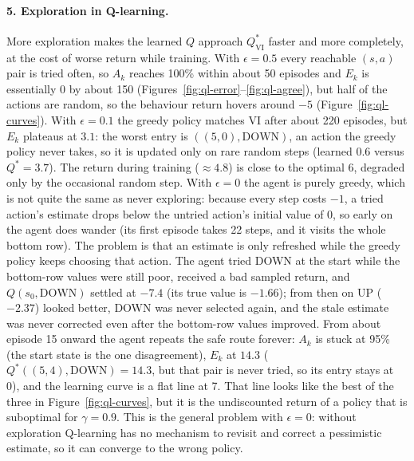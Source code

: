 \documentclass[11pt,letterpaper]{article}
\newcommand{\QVI}{Q^*_{\mathrm{VI}}}
\begin{document}
\paragraph{5. Exploration in Q-learning.}
More exploration makes the learned $Q$ approach $\QVI$ faster and more
completely, at the cost of worse return while training. With
$\epsilon = 0.5$ every reachable $(s,a)$ pair is tried often, so $A_k$
reaches 100\% within about 50 episodes and $E_k$ is essentially 0 by about
150 (Figures~\ref{fig:ql-error}--\ref{fig:ql-agree}), but half of the
actions are random, so the behaviour return hovers around $-5$
(Figure~\ref{fig:ql-curves}). With $\epsilon = 0.1$ the greedy policy
matches VI after about 220 episodes, but $E_k$ plateaus at $3.1$: the
worst entry is $((5,0),\text{DOWN})$, an action the greedy policy never
takes, so it is updated only on rare random steps (learned $0.6$ versus
$Q^* = 3.7$). The return during training ($\approx 4.8$) is close to the
optimal 6, degraded only by the occasional random step. With
$\epsilon = 0$ the agent is purely greedy, which is not quite the same as
never exploring: because every step costs $-1$, a tried action's estimate
drops below the untried action's initial value of 0, so early on the agent
does wander (its first episode takes 22 steps, and it visits the whole
bottom row). The problem is that an estimate is only refreshed while the
greedy policy keeps choosing that action. The agent tried DOWN at the
start while the bottom-row values were still poor, received a bad sampled
return, and $Q(s_0,\text{DOWN})$ settled at $-7.4$ (its true value is
$-1.66$); from then on UP ($-2.37$) looked better, DOWN was never selected
again, and the stale estimate was never corrected even after the
bottom-row values improved. From about episode 15 onward the agent repeats
the safe route forever: $A_k$ is stuck at 95\% (the start state is the one
disagreement), $E_k$ at $14.3$ ($Q^*((5,4),\text{DOWN}) = 14.3$, but that
pair is never tried, so its entry stays at 0), and the learning curve is a
flat line at 7. That line looks like the best of the three in
Figure~\ref{fig:ql-curves}, but it is the undiscounted return of a policy
that is suboptimal for $\gamma = 0.9$. This is the general problem with
$\epsilon = 0$: without exploration Q-learning has no mechanism to revisit
and correct a pessimistic estimate, so it can converge to the wrong
policy.
\end{document}
